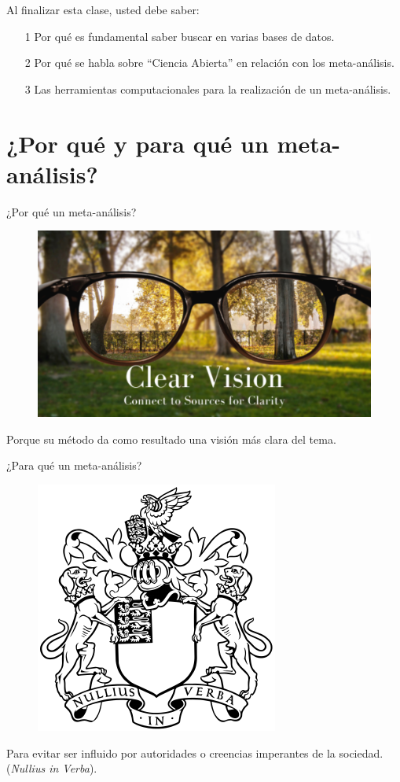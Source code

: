\documentclass[aspectratio=169]{beamer}
\begin{document}
\begin{frame}
\begin{block}{Al finalizar esta clase, usted debe saber:}
\vspace{.2cm}
\begin{itemize}
\item[1] Por qué es fundamental saber buscar en varias bases de datos. 
\vspace{.2cm}
\item[2] Por qué se habla sobre ``Ciencia Abierta'' en relación con los meta-análisis.
\vspace{.2cm}
\item[3] Las herramientas computacionales para la realización de un meta-análisis. 
\end{itemize}    
\end{block}
\end{frame}



\section{¿Por qué y para qué un meta-análisis?}

\begin{frame}{¿Por qué un meta-análisis?}
\centering
\begin{figure}
\includegraphics[width=0.7\linewidth]{Claridad.png}
\end{figure}
Porque su método da como resultado una visión más clara del tema.
\end{frame}

\begin{frame}{¿Para qué un meta-análisis?}
\centering
\begin{figure}
\includegraphics[width=0.3\linewidth]{RoyalSociety.png}
\end{figure}
Para evitar ser influido por autoridades o creencias imperantes de la sociedad. \\
(\textit{Nullius in Verba}).
\end{frame}
\end{document}
